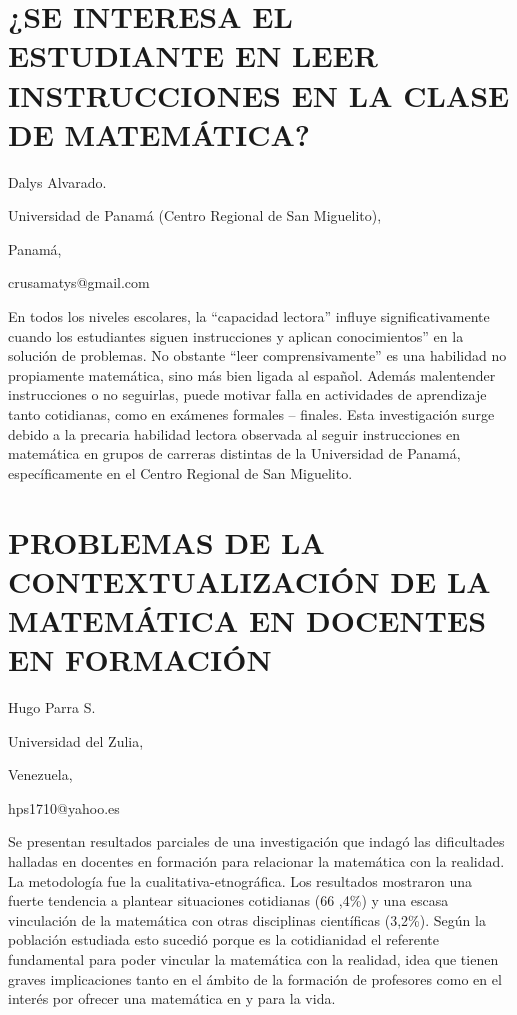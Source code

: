 \section{¿SE INTERESA EL ESTUDIANTE EN LEER INSTRUCCIONES EN LA CLASE DE MATEMÁTICA?}

\begin{datos}

Dalys Alvarado.

Universidad de Panamá (Centro Regional de San Miguelito),

Panamá,

crusamatys@gmail.com

\end{datos}

En todos los niveles escolares, la “capacidad lectora” influye significativamente
cuando los estudiantes siguen instrucciones y aplican conocimientos”
en la solución de problemas. No obstante “leer comprensivamente” es
una habilidad no propiamente matemática, sino más bien ligada al español.
Además malentender instrucciones o no seguirlas, puede motivar falla
en actividades de aprendizaje tanto cotidianas, como en exámenes formales
– finales. Esta investigación surge debido a la precaria habilidad
lectora observada al seguir instrucciones en matemática en grupos
de carreras distintas de la Universidad de Panamá, específicamente
en el Centro Regional de San Miguelito. 


\section{PROBLEMAS DE LA CONTEXTUALIZACIÓN DE LA MATEMÁTICA EN DOCENTES EN
FORMACIÓN}

\begin{datos}

Hugo Parra S. 

Universidad del Zulia,

Venezuela,

hps1710@yahoo.es

\end{datos}

Se presentan resultados parciales de una investigación que indagó
las dificultades halladas en docentes en formación para relacionar
la matemática con la realidad. La metodología fue la cualitativa-etnográfica.
Los resultados mostraron una fuerte tendencia a plantear situaciones
cotidianas (66 ,4\%) y una escasa vinculación de la matemática con
otras disciplinas científicas (3,2\%). Según la población estudiada
esto sucedió porque es la cotidianidad el referente fundamental para
poder vincular la matemática con la realidad, idea que tienen graves
implicaciones tanto en el ámbito de la formación de profesores como
en el interés por ofrecer una matemática en y para la vida.


